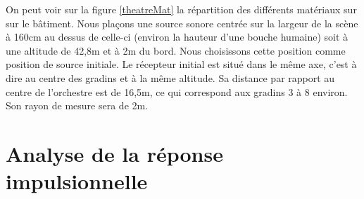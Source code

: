 On peut voir sur la figure \ref{theatreMat} la répartition des différents matériaux sur sur le bâtiment. Nous plaçons une source sonore centrée sur la largeur de la scène à 160cm au dessus de celle-ci (environ la hauteur d'une bouche humaine) soit à une altitude de 42,8m et à 2m du bord. Nous choisissons cette position comme position de source initiale. Le récepteur initial est situé dans le même axe, c'est à dire au centre des gradins et à la même altitude. Sa distance par rapport au centre de l'orchestre est de 16,5m, ce qui correspond aux gradins 3 à 8 environ. Son rayon de mesure sera de 2m. 


\section{Analyse de la réponse impulsionnelle}


